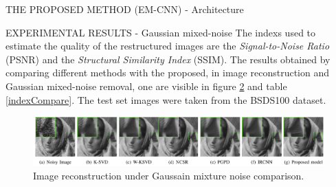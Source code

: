 \begin{frame}{THE PROPOSED METHOD (EM-CNN) - Architecture}
\begin{minipage}{\linewidth}
\begin{minipage}{0.47\linewidth}
\begin{figure}[h!]
                \centering
                \label{fig:EM-CNN}
            \end{figure}
        \end{minipage}
    \end{minipage}
\end{frame}

\begin{frame}{EXPERIMENTAL RESULTS - Gaussian mixed-noise}
    The indexs used to estimate the quality of the restructured images are 
    the \emph{Signal-to-Noise Ratio} (PSNR) and the \emph{Structural Similarity Index} 
    (SSIM). The results obtained by comparing different methods with the 
    proposed, in image reconstruction and Gaussian mixed-noise removal, one 
    are visible in figure \ref{fig:GMNComp} and table \ref{indexCompare}. The test set images were taken from 
    the BSDS100 dataset.
    \begin{figure}[h!]
        \centering
        \includegraphics[width = 0.8\linewidth]{images/paper7/GMN comparison.png}
        \centering
        \caption{Image reconstruction under Gaussain mixture noise comparison.}
        \label{fig:GMNComp}
    \end{figure}
     

\end{frame}
